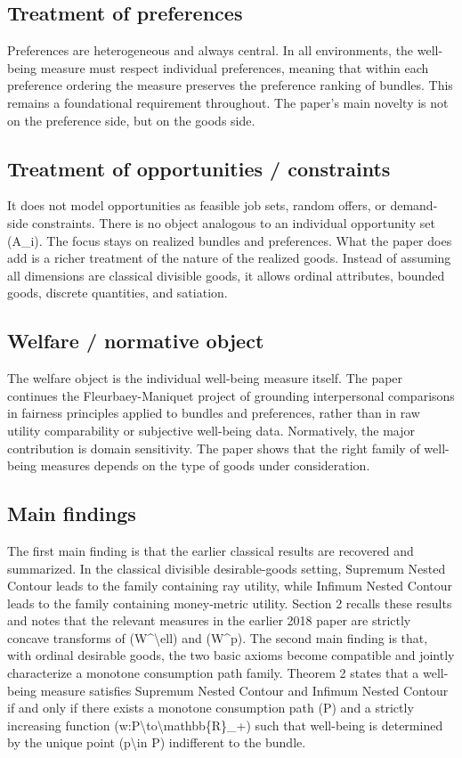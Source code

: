 \documentclass[11pt,a4paper]{article}
\begin{document}
\subsection*{Treatment of preferences}
Preferences are heterogeneous and always central. In all environments, the well-being measure must respect individual preferences, meaning that within each preference ordering the measure preserves the preference ranking of bundles. This remains a foundational requirement throughout. The paper’s main novelty is not on the preference side, but on the goods side.

\subsection*{Treatment of opportunities / constraints}
It does not model opportunities as feasible job sets, random offers, or demand-side constraints. There is no object analogous to an individual opportunity set (A\_i). The focus stays on realized bundles and preferences. What the paper does add is a richer treatment of the nature of the realized goods. Instead of assuming all dimensions are classical divisible goods, it allows ordinal attributes, bounded goods, discrete quantities, and satiation.

\subsection*{Welfare / normative object}
The welfare object is the individual well-being measure itself. The paper continues the Fleurbaey-Maniquet project of grounding interpersonal comparisons in fairness principles applied to bundles and preferences, rather than in raw utility comparability or subjective well-being data. Normatively, the major contribution is domain sensitivity. The paper shows that the right family of well-being measures depends on the type of goods under consideration.

\subsection*{Main findings}
The first main finding is that the earlier classical results are recovered and summarized. In the classical divisible desirable-goods setting, Supremum Nested Contour leads to the family containing ray utility, while Infimum Nested Contour leads to the family containing money-metric utility. Section 2 recalls these results and notes that the relevant measures in the earlier 2018 paper are strictly concave transforms of (W\textasciicircum{}\textbackslash{}ell) and (W\textasciicircum{}p). The second main finding is that, with ordinal desirable goods, the two basic axioms become compatible and jointly characterize a monotone consumption path family. Theorem 2 states that a well-being measure satisfies Supremum Nested Contour and Infimum Nested Contour if and only if there exists a monotone consumption path (P) and a strictly increasing function (w:P\textbackslash{}to\textbackslash{}mathbb\{R\}\_+) such that well-being is determined by the unique point (p\textbackslash{}in P) indifferent to the bundle.
\end{document}
